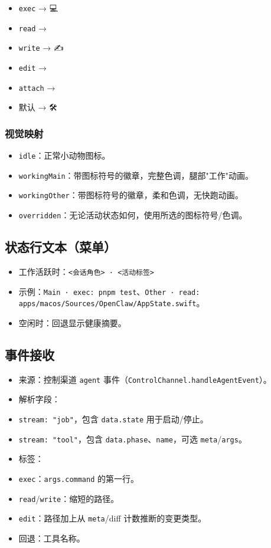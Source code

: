 \begin{itemize}
  \item \texttt{exec} → 💻
  \item \texttt{read} → 📄
  \item \texttt{write} → ✍️
  \item \texttt{edit} → 📝
  \item \texttt{attach} → 📎
  \item 默认 → 🛠️
\end{itemize}


\subsubsection{视觉映射}


\begin{itemize}
  \item \texttt{idle}：正常小动物图标。
  \item \texttt{workingMain}：带图标符号的徽章，完整色调，腿部"工作"动画。
  \item \texttt{workingOther}：带图标符号的徽章，柔和色调，无快跑动画。
  \item \texttt{overridden}：无论活动状态如何，使用所选的图标符号/色调。
\end{itemize}


\subsection{状态行文本（菜单）}


\begin{itemize}
  \item 工作活跃时：\texttt{<会话角色> · <活动标签>}
  \item 示例：\texttt{Main · exec: pnpm test}、\texttt{Other · read: apps/macos/Sources/OpenClaw/AppState.swift}。
  \item 空闲时：回退显示健康摘要。
\end{itemize}


\subsection{事件接收}


\begin{itemize}
  \item 来源：控制渠道 \texttt{agent} 事件（\texttt{ControlChannel.handleAgentEvent}）。
  \item 解析字段：
  \item \texttt{stream: "job"}，包含 \texttt{data.state} 用于启动/停止。
  \item \texttt{stream: "tool"}，包含 \texttt{data.phase}、\texttt{name}，可选 \texttt{meta}/\texttt{args}。
  \item 标签：
  \item \texttt{exec}：\texttt{args.command} 的第一行。
  \item \texttt{read}/\texttt{write}：缩短的路径。
  \item \texttt{edit}：路径加上从 \texttt{meta}/diff 计数推断的变更类型。
  \item 回退：工具名称。
\end{itemize}


